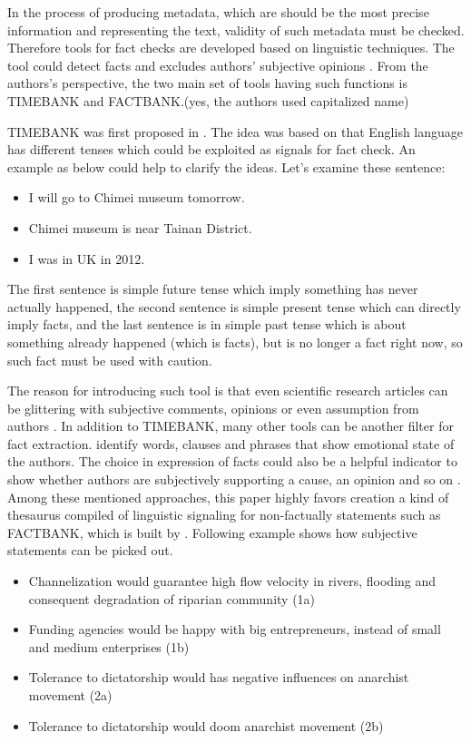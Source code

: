 In the process of producing metadata, which are should be the most precise information and representing the text, validity of such metadata must be checked. 
Therefore tools for fact checks are developed based on linguistic techniques. 
The tool could detect facts and excludes authors' subjective opinions \cite{Agerri2014}. 
From the authors's perspective, the two main set of tools having such functions is TIMEBANK and FACTBANK.(yes, the authors used capitalized name)

TIMEBANK was first proposed in \cite{pustejovsky2003timebank}. 
The idea was based on that English language has different tenses which could be exploited as signals for fact check. 
An example as below could help to clarify the ideas. Let's examine these sentence:

\begin{itemize}
	\item I will go to Chimei museum tomorrow.
	\item Chimei museum is near Tainan District.
	\item I was in UK in 2012.
\end{itemize}

The first sentence is simple future tense which imply something has never actually happened, the second sentence is simple present tense which can directly imply facts, and the last sentence is in simple past tense which is about something already happened (which is facts), but is no longer a fact right now, so such fact must be used with caution. 

The reason for introducing such tool is that even scientific research articles can be glittering with subjective comments, opinions or even assumption from authors \cite{schultze2000confessional}. In addition to TIMEBANK, many other tools can be another filter for fact extraction. 
\cite{Dave2003mining} identify words, clauses and phrases that show emotional state of the authors. 
The choice in expression of facts could also be a helpful indicator to show whether authors are subjectively supporting a cause, an opinion and so on \cite{Wiebe2005}. 
Among these mentioned approaches, this paper highly favors creation a kind of thesaurus compiled of linguistic signaling for non-factually statements such as FACTBANK, which is built by \cite{Sauri2009}. 
Following example shows how subjective statements can be picked out.

\begin{itemize}
	\item Channelization would guarantee high flow velocity in rivers, flooding and consequent degradation of riparian community (1a)
	\item Funding agencies would be happy with big entrepreneurs, instead of small and medium enterprises (1b)
	\item Tolerance to dictatorship would has negative influences on anarchist movement (2a)
	\item Tolerance to dictatorship would doom anarchist movement (2b)
\end{itemize}

